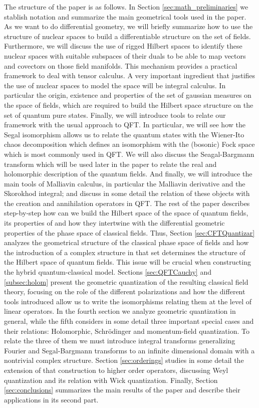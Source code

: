 \documentclass[12pt]{article}%
\begin{document}
The structure of the paper is as follows. In Section \ref{sec:math_preliminaries} we stablish notation and summarize the main geometrical tools used in the paper. As we want to do differential geometry, we will briefly summarize how to use the structure of nuclear spaces  to build a differentiable structure on the set of fields. Furthermore, we will discuss  the use of rigged Hilbert spaces to identify these nuclear spaces with suitable subspaces of their duals to be able to map vectors and covectors on those field manifolds. This mechanism provides a practical framework to deal with tensor calculus.  A very important ingredient  that justifies the use of nuclear spaces to model the space will be  integral calculus. In particular the origin, existence and properties of the set of gaussian measures on the space of fields, which are required to build the Hilbert space structure on the set of quantum pure states. Finally, we will introduce tools to relate our framework with the usual approach to QFT. In particular, we will see how the Segal isomorphism allows us to relate the quantum states with the Wiener-Ito chaos decomposition which defines an isomorphism with the (bosonic) Fock space which is most commonly used in QFT. We will also discuss the Seagal-Bargmann transform which will be used later in the paper to relate the real and holomorphic description of the quantum fields. And finally, we will introduce the main tools of Malliavin calculus, in particular the Malliavin derivative and the Skorokhod integral; and discuss in some detail the relation of these objects with the creation and annihilation operators in QFT.  The rest of the paper describes step-by-step how can we build the Hilbert space of the space of quantum fields, its properties of and how they intertwine with the differential geometric properties of the phase space of classical fields.  Thus, 
Section \ref{sec:CFTQuantizar} analyzes the geometrical structure of the classical phase space of fields and how the introduction of a complex structure in that set determines the structure of the Hilbert space of quantum fields. This issue will be crucial when constructing the hybrid quantum-classical model.  Sections \ref{sec:QFTCauchy} and \ref{subsec:holom} present the geometric quantization of the resulting classical field theory, focusing on the role of the different polarizations and how the different tools introduced allow us to write the isomorphisms relating them at the level of linear operators. In the  fourth section we analyze geometric quantization in general, while the fifth considers in some detail three important special cases and their relations: Holomorphic, Schrödinger  and momentum-field quantization. To relate the three of them we must introduce integral transforms generalizing Fourier and Segal-Bargmann transforms to an infinite dimensional domain with a nontrivial complex structure. Section \ref{sec:orderings} studies in some detail the extension of that construction to higher order operators, discussing Weyl quantization and its relation with Wick quantization. Finally, Section \ref{sec:conclusions} summarizes the main results of the paper and describe their applications in its second part.
\end{document}
